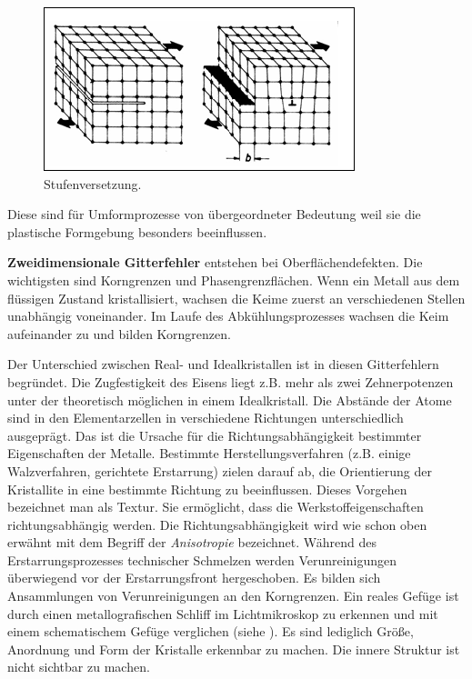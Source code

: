 \documentclass[12pt,a4paper,parskip,twoside,BCOR5mm,headsepline]{scrartcl}
\begin{document}
\begin{description*}
\begin{itemize*}
\begin{enumerate*}
\begin{figure}
\centering
\includegraphics[width=.8\textwidth]{versetzung}
\caption[Stufenversetzung]{Stufenversetzung. \autocite[50]{wk}}
\label{fig:versetzung}
\end{figure}

 Diese sind für Umformprozesse von übergeordneter Bedeutung weil sie die plastische Formgebung besonders beeinflussen.
\item \textbf{Zweidimensionale Gitterfehler} entstehen bei Oberflächendefekten. Die wichtigsten sind Korngrenzen und Phasengrenzflächen. Wenn ein Metall aus dem flüssigen Zustand kristallisiert,  wachsen die Keime zuerst an verschiedenen Stellen unabhängig voneinander. Im Laufe des Abkühlungsprozesses wachsen die Keim aufeinander zu und bilden Korngrenzen.
\end{enumerate*}

Der Unterschied zwischen Real- und Idealkristallen ist in diesen Gitterfehlern begründet. Die Zugfestigkeit des Eisens liegt  z.B. mehr als zwei Zehnerpotenzen unter der theoretisch möglichen in einem Idealkristall. Die Abstände der Atome sind in den Elementarzellen in verschiedene Richtungen unterschiedlich ausgeprägt. Das ist die Ursache für die Richtungsabhängigkeit bestimmter Eigenschaften der Metalle. Bestimmte Herstellungsverfahren (z.B. einige Walzverfahren, gerichtete Erstarrung) zielen darauf ab,  die Orientierung der Kristallite in eine bestimmte Richtung zu beeinflussen. Dieses Vorgehen bezeichnet man als Textur. Sie ermöglicht, dass die Werkstoffeigenschaften richtungsabhängig werden.  Die Richtungsabhängigkeit wird wie schon oben erwähnt mit dem Begriff der \emph{Anisotropie} bezeichnet. 
Während des Erstarrungsprozesses technischer Schmelzen werden Verunreinigungen überwiegend vor der Erstarrungsfront hergeschoben. Es bilden sich Ansammlungen von Verunreinigungen an den Korngrenzen. Ein reales Gefüge ist durch einen metallografischen Schliff im Lichtmikroskop zu erkennen und mit einem schematischem Gefüge verglichen (siehe ). Es sind lediglich Größe, Anordnung und Form der Kristalle erkennbar zu machen. Die innere Struktur ist nicht sichtbar zu machen. \autocite[3-6]{fu}


\end{itemize*}
\end{description*}
\end{document}
